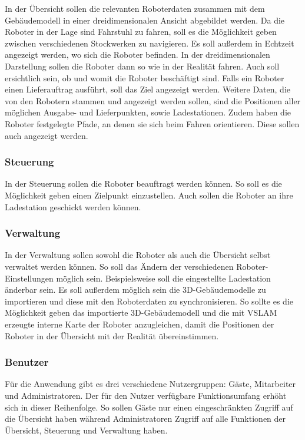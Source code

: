 In der Übersicht sollen die relevanten Roboterdaten zusammen mit dem Gebäudemodell in einer dreidimensionalen Ansicht abgebildet werden. Da die Roboter in der Lage sind Fahrstuhl zu fahren, soll es die Möglichkeit geben zwischen verschiedenen Stockwerken zu navigieren. Es soll außerdem in Echtzeit angezeigt werden, wo sich die Roboter befinden. In der dreidimensionalen Darstellung sollen die Roboter dann so wie in der Realität fahren. Auch soll ersichtlich sein, ob und womit die Roboter beschäftigt sind. Falls ein Roboter einen Lieferauftrag ausführt, soll das Ziel angezeigt werden. Weitere Daten, die von den Robotern stammen und angezeigt werden sollen, sind die Positionen aller möglichen Ausgabe- und Lieferpunkten, sowie Ladestationen. Zudem haben die Roboter festgelegte Pfade, an denen sie sich beim Fahren orientieren. Diese sollen auch angezeigt werden.

\subsubsection{Steuerung}

In der Steuerung sollen die Roboter beauftragt werden können. So soll es die Möglichkeit geben einen Zielpunkt einzustellen. Auch sollen die Roboter an ihre Ladestation geschickt werden können.

\subsubsection{Verwaltung}

In der Verwaltung sollen sowohl die Roboter als auch die Übersicht selbst verwaltet werden können. So soll das Ändern der verschiedenen Roboter-Einstellungen möglich sein. Beispielsweise soll die eingestellte Ladestation änderbar sein. Es soll außerdem möglich sein die 3D-Gebäudemodelle zu importieren und diese mit den Roboterdaten zu synchronisieren. So sollte es die Möglichkeit geben das importierte 3D-Gebäudemodell und die mit \ac{VSLAM} erzeugte interne Karte der Roboter anzugleichen, damit die Positionen der Roboter in der Übersicht mit der Realität übereinstimmen.

\subsubsection{Benutzer}

Für die Anwendung gibt es drei verschiedene Nutzergruppen: Gäste, Mitarbeiter und Administratoren. Der für den Nutzer verfügbare Funktionsumfang erhöht sich in dieser Reihenfolge. So sollen Gäste nur einen eingeschränkten Zugriff auf die Übersicht haben während Administratoren Zugriff auf alle Funktionen der Übersicht, Steuerung und Verwaltung haben.


